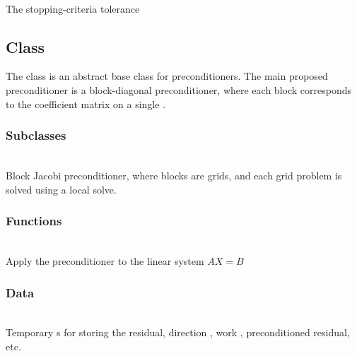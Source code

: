 \documentclass[11pt]{article}
\begin{document}
     \\
    The stopping-criteria tolerance
   

\subsection{ Class} \label{ss:precon}

   The  class is an abstract base class for preconditioners.
   The main proposed preconditioner is a block-diagonal
   preconditioner, where each block corresponds to the coefficient
   matrix on a single .

\subsubsection{ Subclasses}

     \\
    Block Jacobi preconditioner, where blocks are grids, and each grid
    problem is solved using a local  solve.

\subsubsection{ Functions}

     \\
    Apply the preconditioner to the linear system $AX = B$

\subsubsection{ Data}

     \\ Temporary
    s for storing the residual, direction
    , work , preconditioned residual, etc.
\end{document}
